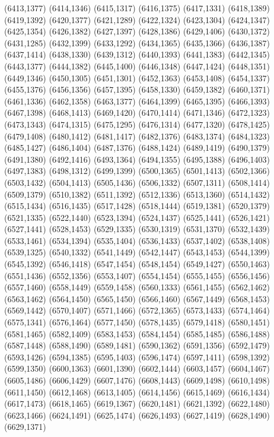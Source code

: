 (6413,1377)
(6414,1346)
(6415,1317)
(6416,1375)
(6417,1331)
(6418,1389)
(6419,1392)
(6420,1377)
(6421,1289)
(6422,1324)
(6423,1304)
(6424,1347)
(6425,1354)
(6426,1382)
(6427,1397)
(6428,1386)
(6429,1406)
(6430,1372)
(6431,1285)
(6432,1399)
(6433,1292)
(6434,1365)
(6435,1366)
(6436,1387)
(6437,1414)
(6438,1330)
(6439,1312)
(6440,1393)
(6441,1383)
(6442,1345)
(6443,1377)
(6444,1382)
(6445,1400)
(6446,1348)
(6447,1424)
(6448,1351)
(6449,1346)
(6450,1305)
(6451,1301)
(6452,1363)
(6453,1408)
(6454,1337)
(6455,1376)
(6456,1356)
(6457,1395)
(6458,1330)
(6459,1382)
(6460,1371)
(6461,1336)
(6462,1358)
(6463,1377)
(6464,1399)
(6465,1395)
(6466,1393)
(6467,1398)
(6468,1413)
(6469,1420)
(6470,1414)
(6471,1346)
(6472,1323)
(6473,1343)
(6474,1315)
(6475,1295)
(6476,1314)
(6477,1320)
(6478,1425)
(6479,1408)
(6480,1412)
(6481,1417)
(6482,1376)
(6483,1374)
(6484,1323)
(6485,1427)
(6486,1404)
(6487,1376)
(6488,1424)
(6489,1419)
(6490,1379)
(6491,1380)
(6492,1416)
(6493,1364)
(6494,1355)
(6495,1388)
(6496,1403)
(6497,1383)
(6498,1312)
(6499,1399)
(6500,1365)
(6501,1413)
(6502,1366)
(6503,1432)
(6504,1413)
(6505,1436)
(6506,1332)
(6507,1311)
(6508,1414)
(6509,1379)
(6510,1382)
(6511,1392)
(6512,1336)
(6513,1360)
(6514,1432)
(6515,1434)
(6516,1435)
(6517,1428)
(6518,1444)
(6519,1381)
(6520,1379)
(6521,1335)
(6522,1440)
(6523,1394)
(6524,1437)
(6525,1441)
(6526,1421)
(6527,1441)
(6528,1453)
(6529,1335)
(6530,1319)
(6531,1370)
(6532,1439)
(6533,1461)
(6534,1394)
(6535,1404)
(6536,1433)
(6537,1402)
(6538,1408)
(6539,1325)
(6540,1332)
(6541,1449)
(6542,1447)
(6543,1453)
(6544,1399)
(6545,1392)
(6546,1418)
(6547,1454)
(6548,1454)
(6549,1427)
(6550,1463)
(6551,1436)
(6552,1356)
(6553,1407)
(6554,1454)
(6555,1455)
(6556,1456)
(6557,1460)
(6558,1449)
(6559,1458)
(6560,1333)
(6561,1455)
(6562,1462)
(6563,1462)
(6564,1450)
(6565,1450)
(6566,1460)
(6567,1449)
(6568,1453)
(6569,1442)
(6570,1407)
(6571,1466)
(6572,1365)
(6573,1433)
(6574,1464)
(6575,1341)
(6576,1464)
(6577,1450)
(6578,1435)
(6579,1418)
(6580,1451)
(6581,1465)
(6582,1409)
(6583,1453)
(6584,1454)
(6585,1485)
(6586,1488)
(6587,1448)
(6588,1490)
(6589,1481)
(6590,1362)
(6591,1356)
(6592,1479)
(6593,1426)
(6594,1385)
(6595,1403)
(6596,1474)
(6597,1411)
(6598,1392)
(6599,1350)
(6600,1363)
(6601,1390)
(6602,1444)
(6603,1457)
(6604,1467)
(6605,1486)
(6606,1429)
(6607,1476)
(6608,1443)
(6609,1498)
(6610,1498)
(6611,1450)
(6612,1468)
(6613,1405)
(6614,1456)
(6615,1469)
(6616,1434)
(6617,1473)
(6618,1465)
(6619,1367)
(6620,1481)
(6621,1392)
(6622,1480)
(6623,1466)
(6624,1491)
(6625,1474)
(6626,1493)
(6627,1419)
(6628,1490)
(6629,1371)
